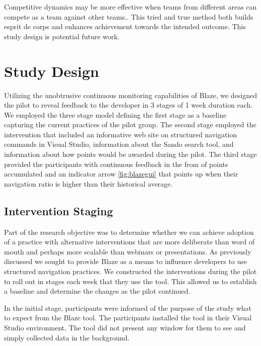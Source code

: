 \documentclass{sig-alternate}
\begin{document}
Competitive dynamics may be more effective when teams from different areas can compete as a team against other teams..  This tried and true method both builds esprit de corps and enhances achievement towards the intended outcome.  This study design is potential future work. 

\section {Study Design}

Utilizing the unobtrusive continuous monitoring capabilities of Blaze, we designed the pilot to reveal feedback to the developer in 3 stages of 1 week duration each.
We employed the three stage model defining the first stage as a baseline capturing the current practices of the pilot group.  The second stage employed the intervention that included an informative web site on structured navigation commands in Visual Studio, information about the Sando search tool, and information about how points would be awarded during the pilot.  The third stage provided the participants with continuous feedback in the from of points accumulated and an indicator arrow \ref{fig:blazegui} that points up when their navigation ratio is higher than their historical average.  

\subsection{Intervention Staging}

Part of the research objective was to determine whether we can achieve adoption of a practice with alternative interventions that are more deliberate than word of mouth and perhaps more scalable than webinars or presentations.  As previously discussed we sought to provide Blaze as a means to influence developers to use structured navigation practices.  We constructed the interventions during the pilot to roll out in stages each week that they use the tool.  This allowed us to establish a baseline and determine the changes as the pilot continued.

In the initial stage, participants were informed of the purpose of the study what to expect from the Blaze tool.  The participants installed the tool in their Visual Studio environment.  The tool did not present any window for them to see and simply collected data in the background.   
\end{document}
